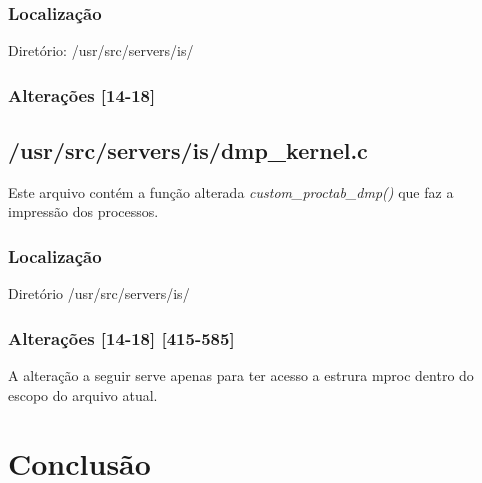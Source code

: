 \documentclass[12pt,a4paper]{article}
\begin{document}
\subsubsection{Localização}

   Diretório: /usr/src/servers/is/

\subsubsection{Alterações [14-18]}
   
   

\subsection{/usr/src/servers/is/dmp\_kernel.c}

   Este arquivo contém a função alterada \emph{ custom\_proctab\_dmp()} que faz a impressão dos processos.

\subsubsection{Localização}

   Diretório /usr/src/servers/is/
   
\subsubsection{Alterações [14-18] [415-585]}

A alteração a seguir serve apenas para ter acesso a estrura mproc dentro do escopo do arquivo atual.


\section{Conclusão}
\end{document}
